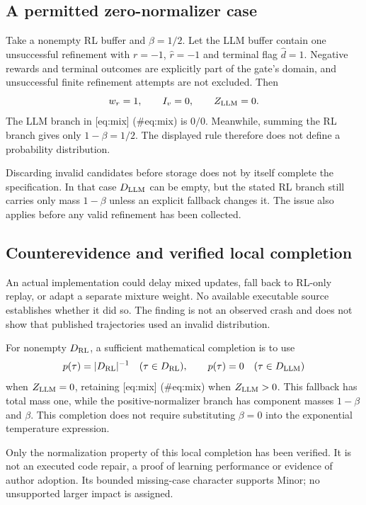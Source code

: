 \documentclass[10pt]{article}
\begin{document}
\subsection*{A permitted zero-normalizer case}
Take a nonempty RL buffer and \(\beta=1/2\). Let the LLM buffer contain one unsuccessful refinement with \(r=-1\), \(\widehat r=-1\) and terminal flag \(\widehat d=1\). Negative rewards and terminal outcomes are explicitly part of the gate’s domain, and unsuccessful finite refinement attempts are not excluded. Then \[w_r=1,\qquad I_v=0,\qquad Z_{\rm LLM}=0.\] The LLM branch in [eq:mix] (\#eq:mix) is \(0/0\). Meanwhile, summing the RL branch gives only \(1-\beta=1/2\). The displayed rule therefore does not define a probability distribution.\par
Discarding invalid candidates before storage does not by itself complete the specification. In that case \(D_{\rm LLM}\) can be empty, but the stated RL branch still carries only mass \(1-\beta\) unless an explicit fallback changes it. The issue also applies before any valid refinement has been collected.\par
\subsection*{Counterevidence and verified local completion}
An actual implementation could delay mixed updates, fall back to RL-only replay, or adapt a separate mixture weight. No available executable source establishes whether it did so. The finding is not an observed crash and does not show that published trajectories used an invalid distribution.\par
For nonempty \(D_{\rm RL}\), a sufficient mathematical completion is to use \[p(\tau)=|D_{\rm RL}|^{-1}\quad(\tau\in D_{\rm RL}),\qquad
 p(\tau)=0\quad(\tau\in D_{\rm LLM})\] when \(Z_{\rm LLM}=0\), retaining [eq:mix] (\#eq:mix) when \(Z_{\rm LLM}>0\). This fallback has total mass one, while the positive-normalizer branch has component masses \(1-\beta\) and \(\beta\). This completion does not require substituting \(\beta=0\) into the exponential temperature expression.\par
Only the normalization property of this local completion has been verified. It is not an executed code repair, a proof of learning performance or evidence of author adoption. Its bounded missing-case character supports Minor; no unsupported larger impact is assigned.\par
\end{document}
